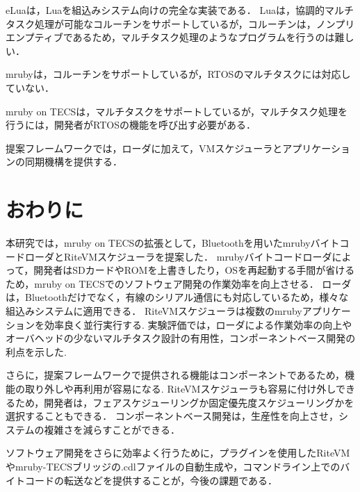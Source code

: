 \documentclass[submit,techrep]{ipsj}
\begin{document}
eLuaは，Luaを組込みシステム向けの完全な実装である．
Luaは，協調的マルチタスク処理が可能なコルーチンをサポートしているが，コルーチンは，ノンプリエンプティブであるため，マルチタスク処理のようなプログラムを行うのは難しい．

mrubyは，コルーチンをサポートしているが，RTOSのマルチタスクには対応していない．

mruby on TECSは，マルチタスクをサポートしているが，マルチタスク処理を行うには，開発者がRTOSの機能を呼び出す必要がある．

提案フレームワークでは，ローダに加えて，VMスケジューラとアプリケーションの同期機構を提供する．

\section{おわりに}
\vspace{-2mm}
\label{sec:Conclusion}
本研究では，mruby on TECSの拡張として，Bluetoothを用いたmrubyバイトコードローダとRiteVMスケジューラを提案した．
mrubyバイトコードローダによって，開発者はSDカードやROMを上書きしたり，OSを再起動する手間が省けるため，mruby on TECSでのソフトウェア開発の作業効率を向上させる．
ローダは，Bluetoothだけでなく，有線のシリアル通信にも対応しているため，様々な組込みシステムに適用できる．
RiteVMスケジューラは複数のmrubyアプリケーションを効率良く並行実行する.
実験評価では，ローダによる作業効率の向上やオーバヘッドの少ないマルチタスク設計の有用性，コンポーネントベース開発の利点を示した.

さらに，提案フレームワークで提供される機能はコンポーネントであるため，機能の取り外しや再利用が容易になる.
RiteVMスケジューラも容易に付け外しできるため，開発者は，フェアスケジューリングか固定優先度スケジューリングかを選択することもできる．
コンポーネントベース開発は，生産性を向上させ，システムの複雑さを減らすことができる．

ソフトウェア開発をさらに効率よく行うために，プラグインを使用したRiteVMやmruby-TECSブリッジの.cdlファイルの自動生成や，コマンドライン上でのバイトコードの転送などを提供することが，今後の課題である．

\vspace{-2mm}


\end{document}
